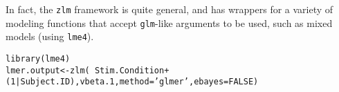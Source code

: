 \documentclass{article}\usepackage[]{graphicx}\usepackage[usenames,dvipsnames]{color}
\newcommand{\hlnum}[1]{\textcolor[rgb]{0.816,0.125,0.439}{#1}}%
\newcommand{\hlstr}[1]{\textcolor[rgb]{0.251,0.627,0.251}{#1}}%
\newcommand{\hlopt}[1]{\textcolor[rgb]{0,0,0}{#1}}%
\newcommand{\hlstd}[1]{\textcolor[rgb]{0.251,0.251,0.251}{#1}}%
\newcommand{\hlkwb}[1]{\textcolor[rgb]{0,0,0}{#1}}%
\newcommand{\hlkwc}[1]{\textcolor[rgb]{0.251,0.251,0.251}{#1}}%
\newcommand{\hlkwd}[1]{\textcolor[rgb]{0.878,0.439,0.125}{#1}}%
\newenvironment{knitrout}{}{} %
\begin{document}
In fact, the \texttt{zlm} framework is quite general, and has wrappers for a variety of  modeling functions that accept \texttt{glm}-like arguments to be used, such as mixed models (using \texttt{lme4}).
\begin{knitrout}
\color{fgcolor}\begin{kframe}
\begin{alltt}
\hlkwd{library}\hlstd{(lme4)}
\hlstd{lmer.output} \hlkwb{<-} \hlkwd{zlm}\hlstd{(}\hlopt{~} \hlstd{Stim.Condition} \hlopt{+}\hlstd{(}\hlnum{1}\hlopt{|}\hlstd{Subject.ID), vbeta.1,} \hlkwc{method}\hlstd{=}\hlstr{'glmer'}\hlstd{,} \hlkwc{ebayes}\hlstd{=}\hlnum{FALSE}\hlstd{)}
\end{alltt}
\end{kframe}
\end{knitrout}
\end{document}
